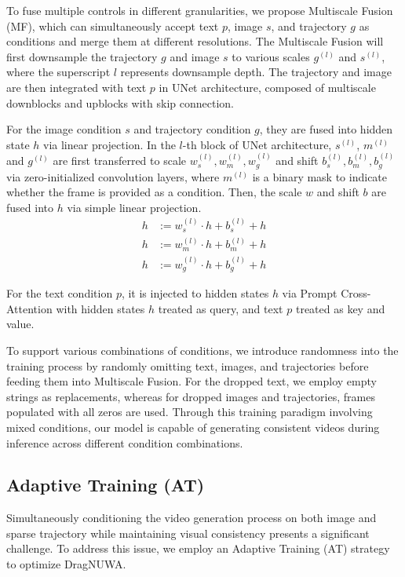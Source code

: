 \documentclass{article} %
\begin{document}
To fuse multiple controls in different granularities, we propose Multiscale Fusion (MF), which can simultaneously accept text $p$, image $s$, and trajectory $g$ as conditions and merge them at different resolutions. The Multiscale Fusion will first downsample the trajectory $g$ and image $s$ to various scales $g^{(l)}$ and $s^{(l)}$, where the superscript $l$ represents  downsample depth. The trajectory and image are then integrated with text $p$ in UNet architecture, composed of multiscale downblocks and upblocks with skip connection. 

For the image condition $s$ and trajectory condition $g$, they are fused into hidden state $h$ via linear projection. 
In the $l$-th block of UNet architecture, $s^{(l)}$, $m^{(l)}$ and $g^{(l)}$ are first transferred to scale $w_s^{(l)},w_m^{(l)},w_g^{(l)}$ and shift $b_s^{(l)},b_m^{(l)},b_g^{(l)}$ via zero-initialized convolution layers, where $m^{(l)}$ is a binary mask to indicate whether the frame is provided as a condition. Then, the scale $w$ and shift $b$ are fused into $h$ via simple linear projection.
\begin{align}
    h&:=w_s^{(l)}\cdot h+b_s^{(l)}+h \\
    h&:=w_m^{(l)}\cdot h+b_m^{(l)}+h \\
    h&:=w_g^{(l)}\cdot h+b_g^{(l)}+h 
\end{align}

For the text condition $p$, it is injected to hidden states $h$ via Prompt Cross-Attention with hidden states $h$ treated as query, and text $p$ treated as key and value.

To support various combinations of conditions, we introduce randomness into the training process by randomly omitting text, images, and trajectories before feeding them into Multiscale Fusion. For the dropped text, we employ empty strings as replacements, whereas for dropped images and trajectories, frames populated with all zeros are used. Through this training paradigm involving mixed conditions, our model is capable of generating consistent videos during inference across different condition combinations.



\subsection{Adaptive Training (AT)}\label{sec:at}

Simultaneously conditioning the video generation process on both image and sparse trajectory while maintaining visual consistency presents a significant challenge. To address this issue, we employ an Adaptive Training (AT) strategy to optimize DragNUWA. 
\end{document}
